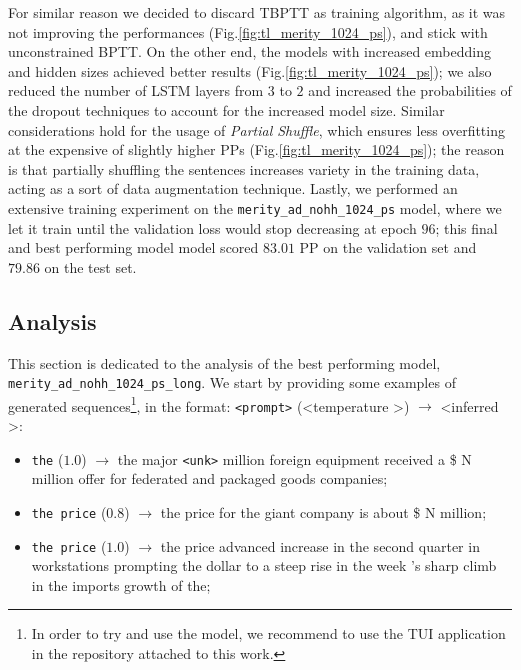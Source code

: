 For similar reason we decided to discard TBPTT as training algorithm, as it was not improving the performances (Fig.\ref{fig:tl_merity_1024_ps}), and stick with unconstrained BPTT. On the other end, the models with increased embedding and hidden sizes achieved better results (Fig.\ref{fig:tl_merity_1024_ps}); we also reduced the number of LSTM layers from $3$ to $2$ and increased the probabilities of the dropout techniques to account for the increased model size. Similar considerations hold for the usage of \emph{Partial Shuffle}, which ensures less overfitting at the expensive of slightly higher PPs (Fig.\ref{fig:tl_merity_1024_ps}); the reason is that partially shuffling the sentences increases variety in the training data, acting as a sort of data augmentation technique. Lastly, we performed an extensive training experiment on the \texttt{merity\_ad\_nohh\_1024\_ps} model, where we let it train until the validation loss would stop decreasing at epoch $96$; this final and best performing model model scored $83.01$ PP on the validation set and $79.86$ on the test set.

\subsection{Analysis}
This section is dedicated to the analysis of the best performing model, \texttt{merity\_ad\_nohh\_1024\_ps\_long}. We start by providing some examples of generated sequences\footnote{In order to try and use the model, we recommend to use the  TUI application in the repository attached to this work.}, in the format: \texttt{<prompt>} (\textless temperature \textgreater) $\rightarrow$ \textless inferred \textgreater:
\begin{itemize}
    \item \texttt{the} ($1.0$) $\rightarrow$ the major \texttt{<unk>} million foreign equipment received a \$ N million offer for federated and packaged goods companies;
    \item \texttt{the price} ($0.8$) $\rightarrow$ the price for the giant company is about \$ N million;
    \item \texttt{the price} ($1.0$) $\rightarrow$ the price advanced increase in the second quarter in workstations prompting the dollar to a steep rise in the week 's sharp climb in the imports growth of the;
\end{itemize}

